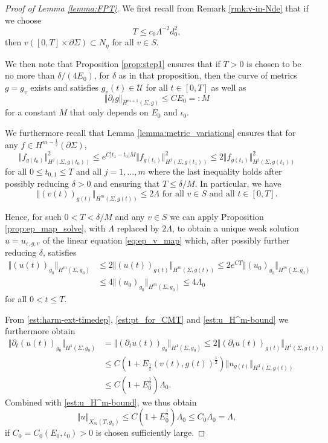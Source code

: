 \documentclass[10pt,reqno]{amsart}
\theoremstyle{plain}
\theoremstyle{definition}
\numberwithin{equation}{section}
\newcommand{\de}{\delta}
\newcommand{\La}{\Lambda}
\newcommand{\Si}{\Sigma}
\newcommand{\ep}{\varepsilon}
\DeclareMathOperator{\inj}{inj}
\newcommand{\norm}[1]{\Vert#1\Vert}
\newcommand{\beq}{\begin{equation}}
\newcommand{\eeq}{\end{equation}}
\newcommand{\beqs}{\begin{equation*}}
\newcommand{\eeqs}{\end{equation*}}
\newcommand{\beqa}{\begin{equation}\begin{aligned}}
\newcommand{\eeqa}{\end{aligned}\end{equation}}
\newcommand{\half}{\frac{1}{2}}
\newcommand{\pt}{\partial_t}
\newcommand{\abs}[1]{\vert#1\vert}
\newcommand{\pSi}{{\partial \Sigma}}
\newcommand{\UU}{{\mathcal U}}
\newcommand{\hf}{\frac{1}{2}} %
\newcommand{\p}{\partial} %
\begin{document}
\begin{proof}[Proof of Lemma \ref{lemma:FPT}]
    We first recall from Remark \ref{rmk:v-in-Nde} that if we choose
    \beqs
        T\le c_0\La^{-2}d_0^2,
    \eeqs
    then $v([0,T]\times\pSi)\subset N_{\eta}$ for all $v\in S$. 
    
    We then note that Proposition \ref{prop:step1} ensures that if $T>0$ is chosen to be no more than $\delta/(4E_0)$, for $\de$ as in that proposition, then the curve of metrics $g=g_v$ exists and satisfies $g_v(t)\in\UU$ for all $t\in [0,T]$ as well as 
    \beq\label{est:FPT_g}
        \norm{\pt g}_{H^{m+1}(\Si,g)}\le CE_0= :M
    \eeq
    for a constant $M$ that only depends on $E_0$ and $\iota_0$. 
    
    We furthermore recall that Lemma \ref{lemma:metric_variations} ensures that for any $f\in H^{m-\hf}(\pSi)$,
    \begin{equation}\label{est:harm-ext-timedep} 
        \norm{f_{g(t_0)}}_{H^j(\Si,g(t_0))}^2 \le e^{C\abs{t_1-t_0}M}\norm{f_{g(t_1)}}_{H^j(\Si,g(t_1))}^2 \le 2\norm{f_{g(t_1)}}_{H^j(\Si,g(t_1))}^2
    \end{equation} 
    for all $0\le t_{0,1}\le T$ and all $j=1,\ldots, m$ where the last inequality holds after possibly reducing $\de>0$ and ensuring that $T\le\delta/M$. In particular, we have
    \beq\label{est:v_H^m-bound}
        \norm{(v(t))_{g(t)}}_{H^m(\Si,g(t))}\le 2 \La \text{ for all } v\in S \text{ and all } t\in [0,T].
    \eeq
    
    Hence, for such $0<T<\de/M$ and any $v\in S$ we can apply Proposition \ref{prop:ep_map_solve}, with $\La$ replaced by $2\La$, to obtain a unique weak solution $u=u_{\ep,g,v}$ of the linear equation \eqref{eq:ep_v_map} which, after possibly further reducing $\de$, satisfies
    \beqa\label{est:u_H^m-bound}
        \norm{(u(t))_{g_0}}_{H^m(\Si,g_0)} &\leq 2\norm{(u(t))_{g(t)}}_{H^m(\Si,g(t))} \le 2e^{CT}\norm{(u_0)_{g_0}}_{H^m(\Si,g_0)}\\
        &\le 4\norm{(u_0)_{g_0}}_{H^m(\Si,g_0)}\le 4\La_0
    \eeqa
    for all $0<t\le T$.

    From \eqref{est:harm-ext-timedep}, \eqref{est:pt_for_CMT} and \eqref{est:u_H^m-bound} we furthermore obtain
    \beq\label{est:u_t-bound}
        \begin{split}
            \norm{\p_t(u(t))_{g_0}}_{H^1(\Si,g_0)}&=\norm{(\p_t u(t))_{g_0}}_{H^1(\Si,g_0)} \le 2\norm{(\p_t u(t))_{g(t)}}_{H^1(\Si,g(t))}\\
            &%
            \le C(1+E_\hf(v(t),g(t))^\hf)\norm{u_{g(t)}}_{H^3(\Si,g(t))}\\
            &\le C(1+E_0^\hf)\La_0.
        \end{split}
    \eeq 
    Combined with \eqref{est:u_H^m-bound}, we thus obtain 
    \beqs
        \norm{u}_{X_m(T,g_0)}\le C(1+E_0^\half)\La_0\leq C_0\La_0=\La,
    \eeqs
    if $C_0=C_0(E_0,\iota_0)>0$ is chosen sufficiently large.
    

\end{proof}
\end{document}
